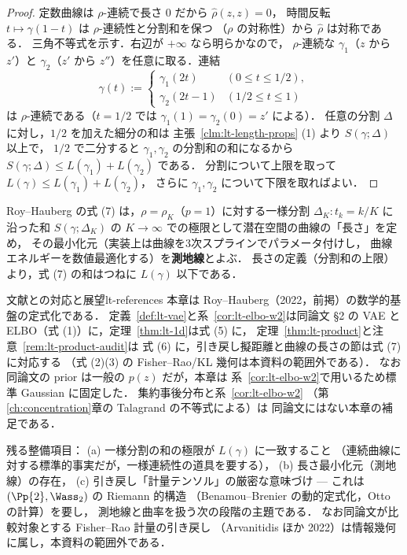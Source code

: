 \begin{proof}
  定数曲線は $\rho$-連続で長さ $0$ だから $\hat\rho(z,z)=0$，
  時間反転 $t\mapsto\gamma(1-t)$ は $\rho$-連続性と分割和を保つ
  （$\rho$ の対称性）から $\hat\rho$ は対称である．
  三角不等式を示す．右辺が $+\infty$ なら明らかなので，
  $\rho$-連続な $\gamma_1$（$z$ から $z'$）と
  $\gamma_2$（$z'$ から $z''$）を任意に取る．連結
  \[
    \gamma(t):=
    \begin{cases}
      \gamma_1(2t)&(0\leq t\leq1/2),\\
      \gamma_2(2t-1)&(1/2\leq t\leq1)
    \end{cases}
  \]
  は $\rho$-連続である（$t=1/2$ では
  $\gamma_1(1)=\gamma_2(0)=z'$ による）．
  任意の分割 $\Delta$ に対し，$1/2$ を加えた細分の和は
  主張~\ref{clm:lt-length-props} (1) より $S(\gamma;\Delta)$ 以上で，
  $1/2$ で二分すると $\gamma_1,\gamma_2$ の分割和の和になるから
  $S(\gamma;\Delta)\leq L(\gamma_1)+L(\gamma_2)$ である．
  分割について上限を取って
  $L(\gamma)\leq L(\gamma_1)+L(\gamma_2)$，
  さらに $\gamma_1,\gamma_2$ について下限を取ればよい．
\end{proof}

Roy--Hauberg の式 (7) は，$\rho=\rho_K$（$p=1$）に対する一様分割
$\Delta_K\colon t_k=k/K$ に沿った和 $S(\gamma;\Delta_K)$ の
$K\to\infty$ での極限として潜在空間の曲線の「長さ」を定め，
その最小化元（実装上は曲線を3次スプラインでパラメータ付けし，
曲線エネルギーを数値最適化する）を\textbf{測地線}とよぶ．
長さの定義（分割和の上限）より，式 (7) の和はつねに
$L(\gamma)$ 以下である．

\begin{remark}{文献との対応と展望}{lt-references}
  本章は Roy--Hauberg（2022，前掲）の数学的基盤の定式化である．
  定義~\ref{def:lt-vae}と系~\ref{cor:lt-elbo-w2}は同論文 §2 の
  VAE と ELBO（式 (1)）に，定理~\ref{thm:lt-1d}は式 (5) に，
  定理~\ref{thm:lt-product}と注意~\ref{rem:lt-product-audit}は
  式 (6) に，引き戻し擬距離と曲線の長さの節は式 (7) に対応する
  （式 (2)(3) の Fisher--Rao/KL 幾何は本資料の範囲外である）．
  なお同論文の prior は一般の $p(z)$ だが，本章は
  系~\ref{cor:lt-elbo-w2}で用いるため標準 Gaussian に固定した．
  集約事後分布と系~\ref{cor:lt-elbo-w2}
  （第\ref{ch:concentration}章の Talagrand の不等式による）は
  同論文にはない本章の補足である．

  残る整備項目：
  (a) 一様分割の和の極限が $L(\gamma)$ に一致すること
  （連続曲線に対する標準的事実だが，一様連続性の道具を要する），
  (b) 長さ最小化元（測地線）の存在，
  (c) 引き戻し「計量テンソル」の厳密な意味づけ —
  これは $(\Pp{2},\Wass_2)$ の Riemann 的構造
  （Benamou--Brenier の動的定式化，Otto の計算）を要し，
  測地線と曲率を扱う次の段階の主題である．
  なお同論文が比較対象とする Fisher--Rao 計量の引き戻し
  （Arvanitidis ほか 2022）は情報幾何に属し，本資料の範囲外である．
\end{remark}
